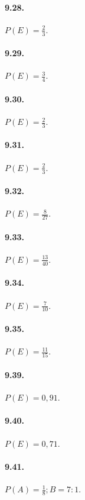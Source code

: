 \begin{multicols}{2}
\paragraph{9.28.} $P(E)=\frac 2 3$.

\paragraph{9.29.} $P(E)=\frac 3 4$.

\paragraph{9.30.} $P(E)=\frac 2 3$.

\paragraph{9.31.} $P(E)=\frac 2 3$.

\paragraph{9.32.} $P(E)=\frac 8{27}$.

\paragraph{9.33.} $P(E)=\frac{13}{40}$.

\paragraph{9.34.} $P(E)=\frac 7{10}$.

\paragraph{9.35.} $P(E)=\frac{11}{15}$.

\paragraph{9.39.} $P(E)=0,91$.

\paragraph{9.40.} $P(E)=0,71$.

\paragraph{9.41.} $P(A)=\frac 1 8;B=7:1$.


\end{multicols}
